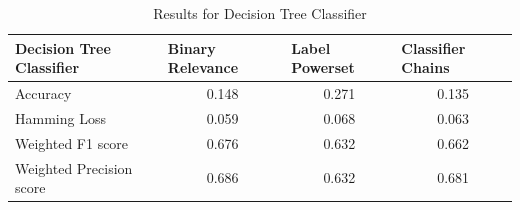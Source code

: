 \begin{table}[!htb]
    \centering
\begin{tabular}{|l|c|c|c|}
\hline
Decision Tree Classifier    & \multicolumn{1}{l|}{Binary Relevance} & \multicolumn{1}{l|}{Label Powerset} & \multicolumn{1}{l|}{Classifier Chains} \\ \hline
Accuracy                 & 0.148                                 & 0.271                               & 0.135                                  \\ \hline
Hamming Loss             & 0.059                                 & 0.068                               & 0.063                                  \\ \hline
Weighted F1 score        & 0.676                                 & 0.632                               & 0.662                                  \\ \hline
Weighted Precision score & 0.686                                 & 0.632                               & 0.681                                  \\ \hline
\end{tabular}
    \caption{Results for Decision Tree Classifier}
    \label{tab:decisiontree}
\end{table}

